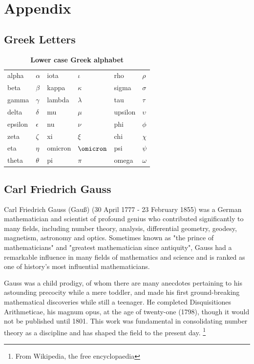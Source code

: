 \documentclass[
  a4paper,
  DIV=11,
  numbers=noendperiod,
  oneside]{scrreprt}
\theoremstyle{definition}
\theoremstyle{remark}
\begin{document}
\chapter{Appendix}\label{appendix}

\section{Greek Letters}\label{sec-greekletters}

\begin{longtable}[]{@{}llllll@{}}
\caption{\textbf{Lower case Greek alphabet}}\tabularnewline
\toprule\noalign{}
\endfirsthead
\endhead
\bottomrule\noalign{}
\endlastfoot
alpha & \(\alpha\) & iota & \(\iota\) & rho & \(\rho\) \\
beta & \(\beta\) & kappa & \(\kappa\) & sigma & \(\sigma\) \\
gamma & \(\gamma\) & lambda & \(\lambda\) & tau & \(\tau\) \\
delta & \(\delta\) & mu & \(\mu\) & upsilon & \(\upsilon\) \\
epsilon & \(\epsilon\) & nu & \(\nu\) & phi & \(\phi\) \\
zeta & \(\zeta\) & xi & \(\xi\) & chi & \(\chi\) \\
eta & \(\eta\) & omicron & \(\omicron\) & psi & \(\psi\) \\
theta & \(\theta\) & pi & \(\pi\) & omega & \(\omega\) \\
\end{longtable}

\section{Carl Friedrich Gauss}\label{carl-friedrich-gauss}

Carl Friedrich Gauss (Gauß) (30 April 1777 - 23 February 1855) was a
German mathematician and scientist of profound genius who contributed
significantly to many fields, including number theory, analysis,
differential geometry, geodesy, magnetism, astronomy and optics.
Sometimes known as "the prince of mathematicians" and "greatest
mathematician since antiquity", Gauss had a remarkable influence in many
fields of mathematics and science and is ranked as one of history's most
influential mathematicians.

Gauss was a child prodigy, of whom there are many anecdotes pertaining
to his astounding precocity while a mere toddler, and made his first
ground-breaking mathematical discoveries while still a teenager. He
completed Disquisitiones Arithmeticae, his magnum opus, at the age of
twenty-one (1798), though it would not be published until 1801. This
work was fundamental in consolidating number theory as a discipline and
has shaped the field to the present day. \footnote{From Wikipedia, the
  free encyclopaedia}
\end{document}
